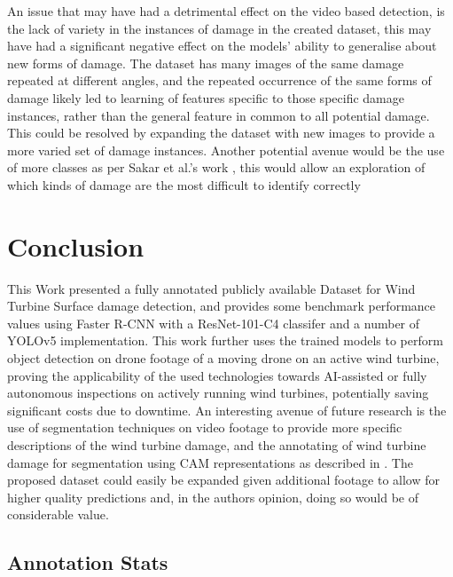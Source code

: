 \documentclass[conference]{IEEEtran}
\begin{document}
An issue that may have had a detrimental effect on the video based detection, is the lack of variety in the instances of damage in the created dataset, this may have had a significant negative effect on the models' ability to generalise about new forms of damage. The dataset has many images of the same damage repeated at different angles, and the repeated occurrence of the same forms of damage likely led to learning of features specific to those specific damage instances, rather than the general feature in common to all potential damage. This could be resolved by expanding the dataset with new images to provide a more varied set of damage instances. Another potential avenue would be the use of more classes as per Sakar et al.'s work \cite{sarkar2021wind}, this would allow an exploration of which kinds of damage are the most difficult to identify correctly

\section{Conclusion}
This Work presented a fully annotated publicly available Dataset for Wind Turbine Surface damage detection, and provides some benchmark performance values using Faster R-CNN with a ResNet-101-C4 classifer and a number of YOLOv5 implementation. This work further uses the trained models to perform object detection on drone footage of a moving drone on an active wind turbine, proving the applicability of the used technologies towards AI-assisted or fully autonomous inspections on actively running wind turbines, potentially saving significant costs due to downtime. An interesting avenue of future research is the use of segmentation techniques on video footage to provide more specific descriptions of the wind turbine damage, and the annotating of wind turbine damage for segmentation using CAM representations as described in \cite{crous2018combining}. The proposed dataset could easily be expanded given additional footage to allow for higher quality predictions and, in the authors opinion, doing so would be of considerable value. 




\cleardoublepage
\appendix

\subsection{Annotation Stats}
\end{document}
